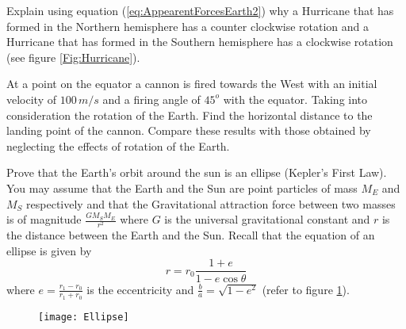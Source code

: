 \documentclass[graybox,envcountchap,sectrefs]{svmonoMuga}
\begin{document}

\begin{exercise}\label{ex:Hurricane}
Explain using equation (\ref{eq:AppearentForcesEarth2}) why a Hurricane that has formed in the Northern hemisphere has a counter clockwise rotation and a Hurricane that has 
formed in the Southern hemisphere has a clockwise rotation (see figure \ref{Fig:Hurricane}). 
\end{exercise}

\begin{exercise}\label{ex:Cannon}
At a point on the equator a cannon is fired towards the West with an initial velocity of 
$100\, m/s$ and a firing angle of $45^{o}$ with the equator. Taking into consideration the rotation 
of the Earth. Find the horizontal distance to the landing point of the cannon. Compare these results with those obtained by neglecting the effects of rotation of the Earth.
\end{exercise}

\begin{exercise}\label{ex:EarthAroundSun}
Prove that the Earth's orbit around the sun is an ellipse (Kepler's First Law). You may assume that the Earth and the Sun are point particles of mass $M_E$ and $M_S$ respectively 
and that the Gravitational attraction force between two masses is of magnitude $\frac{GM_SM_E}{r^2}$ where $G$ is the universal gravitational constant and $r$ is the distance 
between the Earth and the Sun. Recall that the equation of an ellipse is given by
\[
r=r_0\frac{1+e}{1-e\cos{\theta}}
\]
where $e=\frac{r_1-r_0}{r_1+r_0}$ is the eccentricity and
$\frac{b}{a}=\sqrt{1-e^2}$ (refer to figure \ref{Fig:Ellipse}).
\begin{figure}[h]
\begin{center}
\texttt{[image: Ellipse]}
\renewcommand{\baselinestretch}{1}\selectfont
\caption{}
\label{Fig:Ellipse}
\renewcommand{\baselinestretch}{1.5}\selectfont
\end{center}
\end{figure}

\end{exercise}
\end{document}
